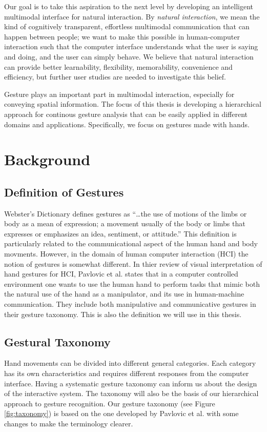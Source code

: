 Our goal is to take this aspiration to the next level by developing an
intelligent multimodal interface for natural interaction. By \textit{natural
interaction}, we mean the kind of cognitively transparent, effortless multimodal
communication that can happen between people; we want to make this possible in
human-computer interaction such that the computer interface understands what the
user is saying and doing, and the user can simply behave. We believe that
natural interaction can provide better learnability, flexibility, memorability,
convenience and efficiency, but further user studies are needed to investigate
this belief.

Gesture plays an important part in multimodal interaction, especially for
conveying spatial information. The focus of this thesis is developing a
hierarchical approach for continous gesture analysis that can be easily
applied in different domains and applications. Specifically, we focus on
gestures made with hands.

\section{Background}

\subsection{Definition of Gestures}
Webster's Dictionary defines gestures as ``\ldots the use of motions of the
limbs or body as a mean of expression; a movement usually of the body or limbs
that expresses or emphasizes an idea, sentiment, or attitude.'' This definition
is particularly related to the communicational aspect of the human hand and body
movments. However, in the domain of human computer interaction (HCI) the notion
of gestures is somewhat different. In thier review of visual interpretation of hand
gestures for HCI, Pavlovic et al. \cite{Pavlovic97} states that in a computer
controlled environment one wants to use the human hand to perform tasks that
mimic both the natural use of the hand as a manipulator, and its use in
human-machine communication. They include both manipulative and communicative
gestures in their gesture taxonomy. This is also the definition we will use in
this thesis.

\subsection{Gestural Taxonomy}\label{sec:taxonomy}
Hand movements can be divided into different general categories. Each
category has its own characteristics and requires different responses from
the computer interface. Having a systematic gesture taxonomy can inform
us about the design of the interactive system. The taxonomy will also be the
basis of our hierarchical approach to gesture recognition. Our gesture taxonomy (see
Figure \ref{fig:taxonomy}) is based on the one developed by Pavlovic et al.
\cite{Pavlovic97} with some changes to make the terminology clearer.


